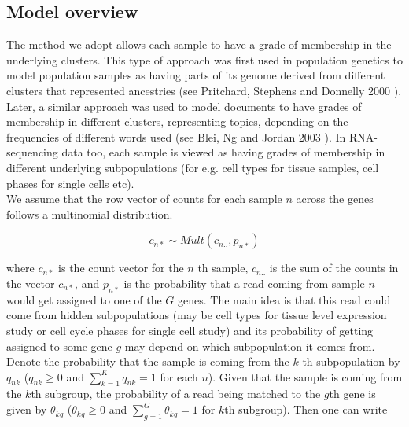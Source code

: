 %
%
%

\subsection{Model overview}

The method we adopt allows each sample to have a grade of membership in the underlying clusters. This type of approach was first used in population genetics to model population samples as having parts of its genome derived from different clusters that represented ancestries (see Pritchard, Stephens and Donnelly 2000 \cite{Pritchard2000}). Later, a similar approach was used to model documents to have grades of membership in different clusters, representing topics, depending on the frequencies of different words used (see Blei, Ng and Jordan 2003 \cite{Blei2003}). In RNA-sequencing data too, each sample is viewed as having grades of membership in different underlying subpopulations (for e.g. cell types for tissue samples, cell phases for single cells etc). \\[1 pt]

We assume that the row vector of counts for each sample $n$ across the genes follows a multinomial distribution.

$$ c_{n*} \sim Mult(c_{n..}, p_{n*}) $$

where $c_{n*}$ is the count vector for the $n$ th sample, $c_{n..}$ is the sum of the counts in the vector $c_{n*}$, and $p_{n*}$ is the probability that a read coming from sample $n$ would get assigned to one of the $G$ genes. The main idea is that this read could come from hidden subpopulations (may be cell types for tissue level expression study or cell cycle phases for single cell study) and its probability of getting assigned to some gene $g$ may depend on which subpopulation it comes from. Denote  the probability that the sample is coming from the $k$ th subpopulation by $q_{nk}$ ($q_{nk} \geq 0$ and $\sum_{k=1}^{K} q_{nk} =1$ for each $n$).  Given that the sample is coming from the $k$th subgroup, the probability of a read being matched to the $g$th gene is given by $\theta_{kg}$ ($\theta_{kg} \geq 0$ and $\sum_{g=1}^{G} \theta_{kg} =1$ for $k$th subgroup). Then one can write 


